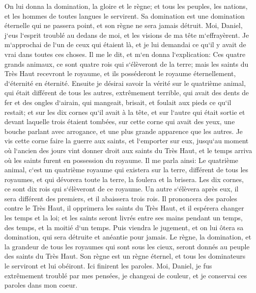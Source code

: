 \verse On lui donna la domination, la gloire et le règne; et tous les peuples, les nations, et les hommes de toutes langues le servirent. Sa domination est une domination éternelle qui ne passera point, et son règne ne sera jamais détruit. 
\verse Moi, Daniel, j`eus l`esprit troublé au dedans de moi, et les visions de ma tête m`effrayèrent. 
\verse Je m`approchai de l`un de ceux qui étaient là, et je lui demandai ce qu`il y avait de vrai dans toutes ces choses. Il me le dit, et m`en donna l`explication: 
\verse Ces quatre grands animaux, ce sont quatre rois qui s`élèveront de la terre; 
\verse mais les saints du Très Haut recevront le royaume, et ils posséderont le royaume éternellement, d`éternité en éternité. 
\verse Ensuite je désirai savoir la vérité sur le quatrième animal, qui était différent de tous les autres, extrêmement terrible, qui avait des dents de fer et des ongles d`airain, qui mangeait, brisait, et foulait aux pieds ce qu`il restait; 
\verse et sur les dix cornes qu`il avait à la tête, et sur l`autre qui était sortie et devant laquelle trois étaient tombées, sur cette corne qui avait des yeux, une bouche parlant avec arrogance, et une plus grande apparence que les autres. 
\verse Je vis cette corne faire la guerre aux saints, et l`emporter sur eux, 
\verse jusqu`au moment où l`ancien des jours vint donner droit aux saints du Très Haut, et le temps arriva où les saints furent en possession du royaume. 
\verse Il me parla ainsi: Le quatrième animal, c`est un quatrième royaume qui existera sur la terre, différent de tous les royaumes, et qui dévorera toute la terre, la foulera et la brisera. 
\verse Les dix cornes, ce sont dix rois qui s`élèveront de ce royaume. Un autre s`élèvera après eux, il sera différent des premiers, et il abaissera trois rois. 
\verse Il prononcera des paroles contre le Très Haut, il opprimera les saints du Très Haut, et il espérera changer les temps et la loi; et les saints seront livrés entre ses mains pendant un temps, des temps, et la moitié d`un temps. 
\verse Puis viendra le jugement, et on lui ôtera sa domination, qui sera détruite et anéantie pour jamais. 
\verse Le règne, la domination, et la grandeur de tous les royaumes qui sont sous les cieux, seront donnés au peuple des saints du Très Haut. Son règne est un règne éternel, et tous les dominateurs le serviront et lui obéiront. 
\verse Ici finirent les paroles. Moi, Daniel, je fus extrêmement troublé par mes pensées, je changeai de couleur, et je conservai ces paroles dans mon coeur. 

